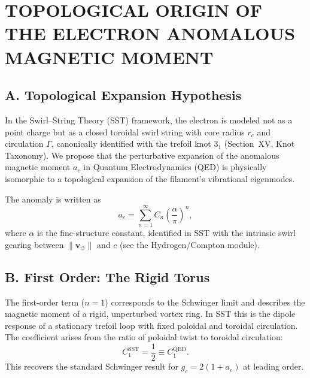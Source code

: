 \documentclass[10pt,reprint,aps,onecolumn,nofootinbib]{revtex4-2}
\begin{document}

\section{TOPOLOGICAL ORIGIN OF THE ELECTRON ANOMALOUS MAGNETIC MOMENT}
\subsection*{A. Topological Expansion Hypothesis}

    In the Swirl--String Theory (SST) framework, the electron is modeled not as a point charge but as a closed toroidal
    swirl string with core radius $r_c$ and circulation $\Gamma$, canonically identified with the trefoil knot $3_1$
    (Section~XV, Knot Taxonomy).
    We propose that the perturbative expansion of the anomalous magnetic moment $a_e$ in Quantum Electrodynamics (QED)
    is physically isomorphic to a topological expansion of the filament's vibrational eigenmodes.

    The anomaly is written as
    \begin{equation}
        a_e = \sum_{n=1}^{\infty} C_n \left( \frac{\alpha}{\pi} \right)^n ,
    \end{equation}
    where $\alpha$ is the fine-structure constant, identified in SST with the intrinsic swirl gearing between
    $\lVert\mathbf{v}_{\!\boldsymbol{\circlearrowleft}}\rVert$ and $c$ (see the Hydrogen/Compton module).

\subsection*{B. First Order: The Rigid Torus}

    The first-order term ($n = 1$) corresponds to the Schwinger limit and describes the magnetic moment of a rigid,
    unperturbed vortex ring. In SST this is the dipole response of a stationary trefoil loop with fixed poloidal and
    toroidal circulation. The coefficient arises from the ratio of poloidal twist to toroidal circulation:
    \begin{equation}
        C_1^{\text{SST}} = \frac{1}{2} \equiv C_1^{\text{QED}} .
    \end{equation}
    This recovers the standard Schwinger result for $g_e = 2(1 + a_e)$ at leading order.
\end{document}
